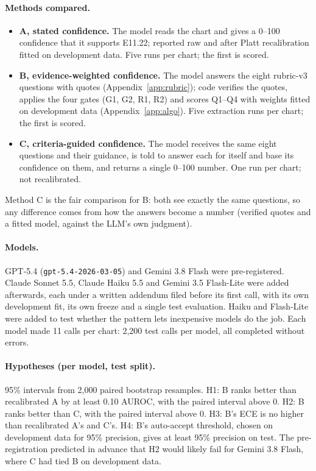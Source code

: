 \documentclass[10pt,letterpaper]{article}
\begin{document}
\paragraph{Methods compared.}
\begin{itemize}
  \item \textbf{A, stated confidence.} The model reads the chart and gives a 0--100 confidence that it supports E11.22; reported raw and after Platt recalibration fitted on development data. Five runs per chart; the first is scored.
  \item \textbf{B, evidence-weighted confidence.} The model answers the eight rubric-v3 questions with quotes (Appendix~\ref{app:rubric}); code verifies the quotes, applies the four gates (G1, G2, R1, R2) and scores Q1--Q4 with weights fitted on development data (Appendix~\ref{app:algo}). Five extraction runs per chart; the first is scored.
  \item \textbf{C, criteria-guided confidence.} The model receives the same eight questions and their guidance, is told to answer each for itself and base its confidence on them, and returns a single 0--100 number. One run per chart; not recalibrated.
\end{itemize}
Method C is the fair comparison for B: both see exactly the same questions, so any difference comes from how the answers become a number (verified quotes and a fitted model, against the LLM's own judgment).

\paragraph{Models.} GPT-5.4 (\texttt{gpt-5.4-2026-03-05}) and Gemini 3.8 Flash were pre-registered. Claude Sonnet 5.5, Claude Haiku 5.5 and Gemini 3.5 Flash-Lite were added afterwards, each under a written addendum filed before its first call, with its own development fit, its own freeze and a single test evaluation. Haiku and Flash-Lite were added to test whether the pattern lets inexpensive models do the job. Each model made 11 calls per chart: 2,200 test calls per model, all completed without errors.

\paragraph{Hypotheses (per model, test split).} 95\% intervals from 2,000 paired bootstrap resamples.
H1: B ranks better than recalibrated A by at least 0.10 AUROC, with the paired interval above 0.
H2: B ranks better than C, with the paired interval above 0.
H3: B's ECE is no higher than recalibrated A's and C's.
H4: B's auto-accept threshold, chosen on development data for 95\% precision, gives at least 95\% precision on test.
The pre-registration predicted in advance that H2 would likely fail for Gemini 3.8 Flash, where C had tied B on development data.
\end{document}
